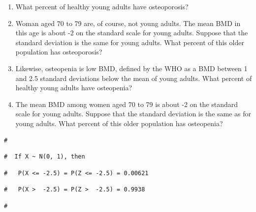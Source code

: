 \documentclass[letterpaper,12pt,twoside,]{pinp}
\providecommand{\tightlist}{%
  \setlength{\itemsep}{0pt}\setlength{\parskip}{0pt}}
\begin{document}
\begin{enumerate}
\def\labelenumi{\alph{enumi}.}
\tightlist
\item
  What percent of healthy young adults have osteoporosis?
\item
  Woman aged 70 to 79 are, of course, not young adults. The mean BMD in
  this age is about -2 on the standard scale for young adults. Suppose
  that the standard deviation is the same for young adults. What percent
  of this older population has osteoporosis?
\item
  Likewise, osteopenia is low BMD, defined by the WHO as a BMD between 1
  and 2.5 standard deviations below the mean of young adults. What
  percent of healthy young adults have osteopenia?
\item
  The mean BMD among women aged 70 to 79 is about -2 on the standard
  scale for young adults. Suppose that the standard deviation is the
  same as for young adults. What percent of this older population has
  osteopenia?
\end{enumerate}

\begin{Shaded}
\begin{Highlighting}[]
\OperatorTok{::}\NormalTok{(} \NormalTok{)}
\end{Highlighting}
\end{Shaded}

\begin{ShadedResult}
\begin{verbatim}
#  
\end{verbatim}
\end{ShadedResult}
\begin{ShadedResult}
\begin{verbatim}
#  If X ~ N(0, 1), then
\end{verbatim}
\end{ShadedResult}
\begin{ShadedResult}
\begin{verbatim}
#   P(X <= -2.5) = P(Z <= -2.5) = 0.00621
\end{verbatim}
\end{ShadedResult}
\begin{ShadedResult}
\begin{verbatim}
#   P(X >  -2.5) = P(Z >  -2.5) = 0.9938
\end{verbatim}
\end{ShadedResult}
\begin{ShadedResult}
\begin{verbatim}
#  
\end{verbatim}
\end{ShadedResult}
\end{document}
